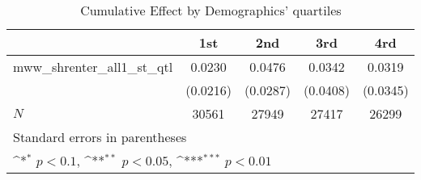 \begin{table}[htbp]\centering
\def\sym#1{\ifmmode^{#1}\else\(^{#1}\)\fi}
\caption{Cumulative Effect by Demographics' quartiles}
\begin{tabular}{l*{4}{c}}
\hline\hline
            &\multicolumn{1}{c}{1st}&\multicolumn{1}{c}{2nd}&\multicolumn{1}{c}{3rd}&\multicolumn{1}{c}{4rd}\\
\hline
mww\_shrenter\_all1\_st\_qtl&      0.0230         &      0.0476         &      0.0342         &      0.0319         \\
            &    (0.0216)         &    (0.0287)         &    (0.0408)         &    (0.0345)         \\
\hline
\(N\)       &       30561         &       27949         &       27417         &       26299         \\
\hline\hline
\multicolumn{5}{l}{\footnotesize Standard errors in parentheses}\\
\multicolumn{5}{l}{\footnotesize \sym{*} \(p<0.1\), \sym{**} \(p<0.05\), \sym{***} \(p<0.01\)}\\
\end{tabular}
\end{table}
